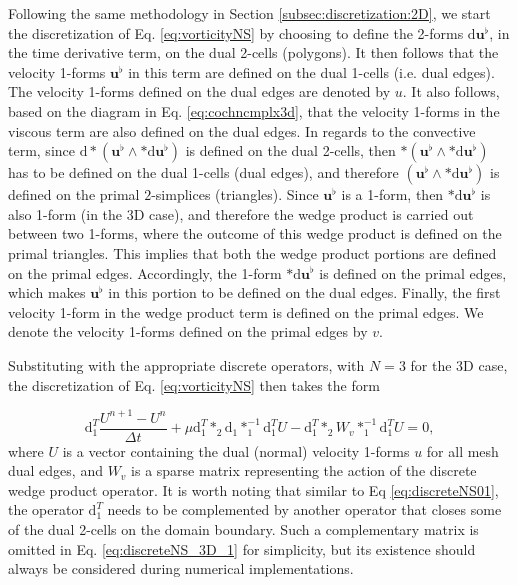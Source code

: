 \documentclass[final,12pt,times]{elsarticle}
\begin{document}
Following the same methodology in Section \ref{subsec:discretization:2D}, we start the discretization of Eq. \eqref{eq:vorticityNS} by choosing to define the 2-forms $\textrm{d} \mathbf{u}^\flat$, in the time derivative term, on the dual 2-cells (polygons). It then follows that the velocity 1-forms $\mathbf{u}^\flat$ in this term are defined on the dual 1-cells (i.e. dual edges). The velocity 1-forms defined on the dual edges are denoted by $u$. It also follows, based on the diagram in Eq. \eqref{eq:cochncmplx3d}, that the velocity 1-forms in the viscous term are also defined on the dual edges. In regards to the convective term, since $\textrm{d} \ast(\mathbf{u}^\flat \wedge \ast \textrm{d} \mathbf{u}^\flat)$  is defined on the dual 2-cells, then $\ast(\mathbf{u}^\flat \wedge \ast \textrm{d} \mathbf{u}^\flat)$ has to be defined on the dual 1-cells (dual edges), and therefore $(\mathbf{u}^\flat \wedge \ast \textrm{d} \mathbf{u}^\flat)$ is defined on the primal $2$-simplices (triangles). Since $\mathbf{u}^\flat$ is a 1-form, then $\ast \textrm{d} \mathbf{u}^\flat$ is also 1-form (in the 3D case), and therefore the wedge product is carried out between two 1-forms, where the outcome of this wedge product is defined on the primal triangles. This implies that both the wedge product portions are defined on the primal edges. Accordingly, the 1-form $\ast \textrm{d} \mathbf{u}^\flat$ is defined on the primal edges, which makes $\mathbf{u}^\flat$ in this portion to be defined on the dual edges. Finally, the first velocity 1-form in the wedge product term is defined on the primal edges. We denote the velocity 1-forms defined on the primal edges by $v$. 

Substituting with the appropriate discrete operators, with $N=3$ for the 3D case, the discretization of Eq. \eqref{eq:vorticityNS} then takes the form       

\begin{equation}
\label{eq:discreteNS_3D_1}
 \textrm{d}^T_1 \frac{U^{n+1} - U^n}{\Delta t} + \mu \textrm{d}^T_1 \ast_2 \textrm{d}_1 \ast^{-1}_1 \textrm{d}^T_1 U -  \textrm{d}^T_1 \ast_2 W_v \ast^{-1}_1 \textrm{d}^T_1 U =0, 
\end{equation}
where $U$ is a vector containing the dual (normal) velocity 1-forms $u$ for all mesh dual edges, and $W_v$ is a sparse matrix representing the action of the discrete wedge product operator. It is worth noting that similar to Eq \eqref{eq:discreteNS01}, the operator $\textrm{d}^T_1$ needs to be complemented by another operator that closes some of the dual 2-cells on the domain boundary. Such a complementary matrix is omitted in Eq. \eqref{eq:discreteNS_3D_1} for simplicity, but its existence should always be considered during numerical implementations.  
\end{document}
